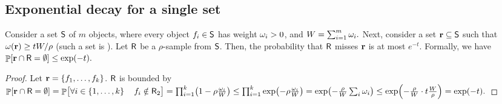 
\subsection{Exponential decay for a single set}



\begin{lemma}%
    Consider a set $\mathsf{S}$ of $m$ objects, where every object
    $f_i \in \mathsf{S}$ has weight $\omega_i > 0 $, and
    \begin{math}
        W= \sum_{i=1}^m \omega_i.
    \end{math}
    Next, consider a set $\mathbf{r} \subseteq \mathsf{S}$ such that
    $\WeightX{\range} \geq t \TotalW / \rho$ (such a set is
    ). Let $\mathsf{R}$ be a $\rho$-sample from
    $\mathsf{S}$. Then, the probability that $\mathsf{R}$ misses $\mathbf{r}$ is
    at most $e^{-t}$. Formally, we have
    \begin{math}
        \Prob{ \range \cap \Sample = \emptyset} \leq \exp\pth{-t}.
    \end{math}
\end{lemma}

\begin{proof}
    Let $\mathbf{r} = \left\{ {f_1, \ldots, f_k} \right\}$.
    $\mathsf{R}$ 
    is bounded by
    \begin{math}
      \Prob{ \range \cap \Sample = \emptyset}%
      =%
      \Prob{ \bigl. \forall i \in \brc{1,\ldots, k} \quad \obj_i
         \notin \Sample_2}%
      =%
      \prod_{i=1}^k \pth{1 - \rho\frac{\Wg_i}{\TotalW}}%
      \leq %
      \prod_{i=1}^k \exp \pth{ - \rho \frac{\Wg_i}{\TotalW}} %
        =%
        \exp \pth{ - \frac{\rho}{\TotalW} \sum_i \Wg_i } %
        \leq%
        \exp\pth{ - \frac{\rho}{\TotalW} \cdot t \frac{\TotalW}{\rho}
        } = \exp\pth{-t}. %
      \end{math}
\end{proof}

